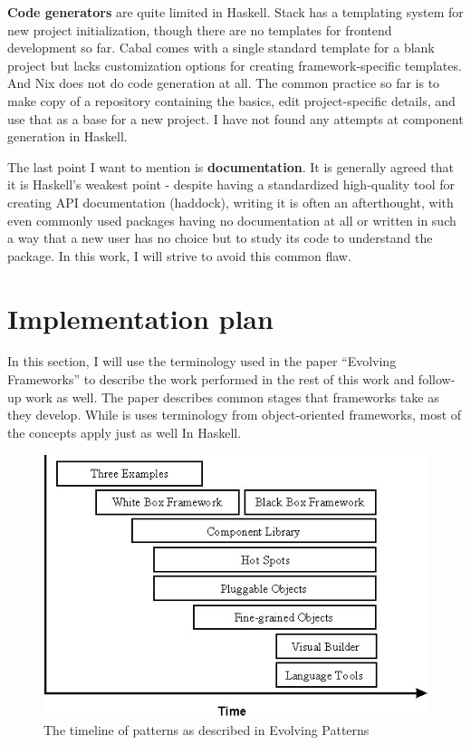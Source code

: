 \documentclass[english,odsaz]{fitthesis}
\begin{document}
\textbf{Code generators} are quite limited in Haskell. Stack has a templating system for
new project initialization, though there are no templates for frontend
development so far. Cabal comes with a single standard template for a blank
project but lacks customization options for creating framework-specific
templates. And Nix does not do code generation at all. The common practice so
far is to make copy of a repository containing the basics, edit project-specific
details, and use that as a base for a new project. I have not found any attempts
at component generation in Haskell.

The last point I want to mention is \textbf{documentation}. It is generally agreed that
it is Haskell's weakest point - despite having a standardized
high-quality tool for creating API documentation (haddock), writing it is often an
afterthought, with even commonly used packages having no documentation at all or
written in such a way that a new user has no choice but to study its code to
understand the package. In this work, I will strive to avoid this common flaw.

\section{Implementation plan}
\label{sec:orgb0ac126}
In this section, I will use the terminology used in the paper ``Evolving Frameworks''
\cite{roberts1996evolving} to describe the work performed in the rest of this work
and follow-up work as well. The paper describes common stages that frameworks
take as they develop. While is uses terminology from object-oriented frameworks,
most of the concepts apply just as well In Haskell.

\begin{figure}[htbp]
\centering
\includegraphics[width=.9\linewidth]{./obrazky-figures/evolving-frameworks.jpg}
\caption{The timeline of patterns as described in Evolving Patterns}
\end{figure}
\end{document}

